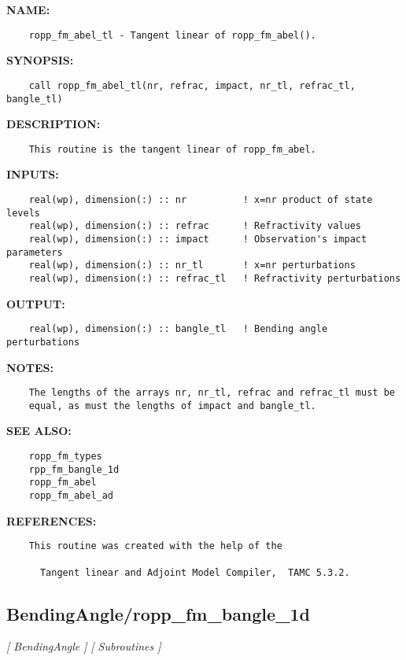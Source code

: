 \label{ch:robo2}
\label{ch:BendingAngle_ropp_fm_abel_tl}
\textbf{NAME:}\hspace{0.08in}\begin{Verbatim}
    ropp_fm_abel_tl - Tangent linear of ropp_fm_abel().
\end{Verbatim}
\textbf{SYNOPSIS:}\hspace{0.08in}\begin{Verbatim}
    call ropp_fm_abel_tl(nr, refrac, impact, nr_tl, refrac_tl, bangle_tl)
\end{Verbatim}
\textbf{DESCRIPTION:}\hspace{0.08in}\begin{Verbatim}
    This routine is the tangent linear of ropp_fm_abel.
\end{Verbatim}
\textbf{INPUTS:}\hspace{0.08in}\begin{Verbatim}
    real(wp), dimension(:) :: nr          ! x=nr product of state levels
    real(wp), dimension(:) :: refrac      ! Refractivity values
    real(wp), dimension(:) :: impact      ! Observation's impact parameters
    real(wp), dimension(:) :: nr_tl       ! x=nr perturbations
    real(wp), dimension(:) :: refrac_tl   ! Refractivity perturbations
\end{Verbatim}
\textbf{OUTPUT:}\hspace{0.08in}\begin{Verbatim}
    real(wp), dimension(:) :: bangle_tl   ! Bending angle perturbations
\end{Verbatim}
\textbf{NOTES:}\hspace{0.08in}\begin{Verbatim}
    The lengths of the arrays nr, nr_tl, refrac and refrac_tl must be
    equal, as must the lengths of impact and bangle_tl.
\end{Verbatim}
\textbf{SEE ALSO:}\hspace{0.08in}\begin{Verbatim}
    ropp_fm_types
    rpp_fm_bangle_1d
    ropp_fm_abel
    ropp_fm_abel_ad
\end{Verbatim}
\textbf{REFERENCES:}\hspace{0.08in}\begin{Verbatim}
    This routine was created with the help of the 

      Tangent linear and Adjoint Model Compiler,  TAMC 5.3.2.
\end{Verbatim}
\subsection{BendingAngle/ropp\_fm\_bangle\_1d}
\textsl{[ BendingAngle ]}
\textsl{[ Subroutines ]}

